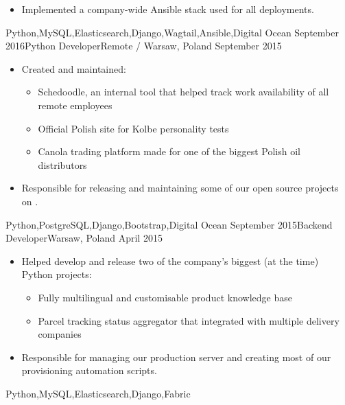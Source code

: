 \documentclass[localFont,alternative,10pt]{yaac-another-awesome-cv}
\begin{document}
\begin{experiences}
{\begin{itemize}
                          \item Implemented a company-wide Ansible stack used for all deployments.
                        \end{itemize}
                      }
                      {Python,MySQL,Elasticsearch,Django,Wagtail,Ansible,Digital Ocean}
    \emptySeparator
    \experience
      {September 2016}{Python Developer}{}{Remote / Warsaw, Poland}
      {September 2015}{
                        \begin{itemize}
                          \item Created and maintained:
                            \begin{itemize}
                              \item Schedoodle, an internal tool that helped track work availability of all remote employees
                              \item Official Polish site for Kolbe personality tests
                              \item Canola trading platform made for one of the biggest Polish oil distributors
                            \end{itemize}
                          \item Responsible for releasing and maintaining some of our open source projects on .
                        \end{itemize}
                      }
                      {Python,PostgreSQL,Django,Bootstrap,Digital Ocean}
    \emptySeparator
    \experience
      {September 2015}{Backend Developer}{}{Warsaw, Poland}
      {April 2015}    {
                        \begin{itemize}
                          \item Helped develop and release two of the company's biggest (at the time) Python projects:
                            \begin{itemize}
                              \item Fully multilingual and customisable product knowledge base
                              \item Parcel tracking status aggregator that integrated with multiple delivery companies
                            \end{itemize}
                          \item Responsible for managing our production server and creating most of our provisioning automation scripts.
                        \end{itemize}
                      }
                      {Python,MySQL,Elasticsearch,Django,Fabric}
  \end{experiences}
\end{document}
